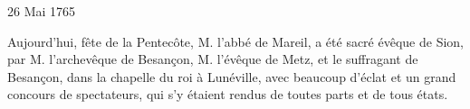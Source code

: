                      \begin{diary}{26 Mai 1765}{}

                         Aujourd'hui, fête de la Pentecôte,
                              M. l'abbé
                              de Mareil, a été sacré évêque de Sion,
                           par M. l'archevêque de
                              Besançon, M. l'évêque
                              de Metz, et le
                              suffragant de Besançon,
                           dans
                           la chapelle du roi à Lunéville, avec
                           beaucoup d'éclat et un grand concours
                           de spectateurs, qui s'y étaient rendus de
                           toutes parts et de tous états. \bigskip


                     \end{diary}


